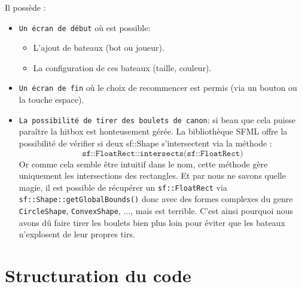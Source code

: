 \documentclass[a4paper,12pt]{article}
\begin{document}
Il possède :
\begin{itemize}
    \item \texttt{Un écran de début} où est possible:
    \begin{itemize}
        \item L'ajout de bateaux (bot ou joueur).
        \item La configuration de ces bateaux (taille, couleur).
    \end{itemize}

    \item \texttt{Un écran de fin} où le choix de recommencer est permis (via un bouton ou la touche espace).
    \item \texttt{La possibilité de tirer des boulets de canon}:
    si beau que cela puisse paraître la hitbox est honteusement gérée.
    La bibliothèque SFML offre la possibilité de vérifier si deux sf::Shape
    s'intersectent via la méthode :
    \[
    \texttt{sf::FloatRect::intersects(sf::FloatRect)}
    \]
    Or comme cela semble être intuitif dans le nom,
    cette méthode gère uniquement les intersections des rectangles.
    Et par nous ne savons quelle magie,
    il est possible de récupérer un \texttt{sf::FloatRect} via
    \texttt{sf::Shape::getGlobalBounds()} donc avec des formes complexes du genre 
    \texttt{CircleShape}, \texttt{ConvexShape}, ..., mais est terrible. C'est ainsi pourquoi nous avons dû
    faire tirer les boulets bien plus loin pour éviter que les bateaux n'explosent de leur propres tirs.
\end{itemize}

\section{Structuration du code}
\end{document}
